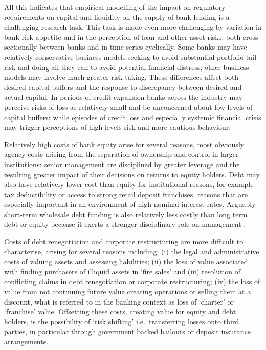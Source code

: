 \documentclass[
  12,
]{article}
\begin{document}
All this indicates that empirical modelling of the impact on regulatory requirements on capital and liquidity on the supply of bank lending is a challenging research task. This task is made even more challenging by variation in bank risk appetite and in the perception of loan and other asset risks, both cross-sectionally between banks and in time series cyclically. Some banks may have relatively conservative business models seeking to avoid substantial portfolio tail risk and doing all they can to avoid potential financial distress; other business models may involve much greater risk taking. These differences affect both desired capital buffers and the response to discrepancy between desired and actual capital. In periods of credit expansion banks across the industry may perceive risks of loss as relatively small and be unconcerned about low levels of capital buffers; while episodes of credit loss and especially systemic financial crisis may trigger perceptions of high levels risk and more cautious behaviour.

Relatively high costs of bank equity arise for several reasons, most obviously agency costs arising from the separation of ownership and control in larger institutions: senior management are disciplined by greater leverage and the resulting greater impact of their decisions on returns to equity holders. Debt may also have relatively lower cost than equity for institutional reasons, for example tax deductibility or access to strong retail deposit franchises, reasons that are especially important in an environment of high nominal interest rates. Arguably short-term wholesale debt funding is also relatively less costly than long term debt or equity because it exerts a stronger disciplinary role on management \citep{calomiris1991role}.

Costs of debt renegotiation and corporate restructuring are more difficult to characterise, arising for several reasons including: (i) the legal and administrative costs of valuing assets and assessing liabilities; (ii) the loss of value associated with finding purchasers of illiquid assets in `fire sales' and (iii) resolution of conflicting claims in debt renegotiation or corporate restructuring; (iv) the loss of value from not continuing future value creating operations or selling them at a discount, what is referred to in the banking context as loss of `charter' or `franchise' value. Offsetting these costs, creating value for equity and debt holders, is the possibility of `risk shifting' i.e.~transferring losses onto third parties, in particular through government backed bailouts or deposit insurance arrangements.
\end{document}
